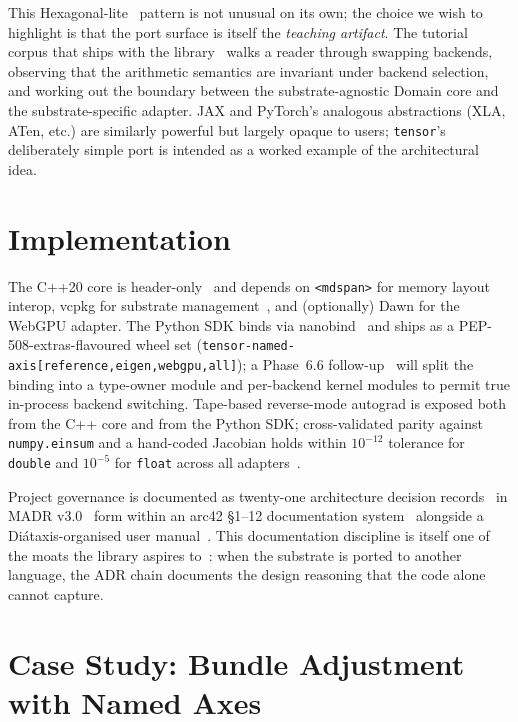 \documentclass[11pt,a4paper]{article}
\begin{document}
\noindent This Hexagonal-lite~\cite{tensorADR0009} pattern is
not unusual on its own; the choice we wish to highlight is that
the port surface is itself the \emph{teaching artifact}. The
tutorial corpus that ships with the library~\cite{tensorTutorials}
walks a reader through swapping backends, observing that the
arithmetic semantics are invariant under backend selection, and
working out the boundary between the substrate-agnostic Domain
core and the substrate-specific adapter. JAX and PyTorch's
analogous abstractions (XLA, ATen, etc.) are similarly powerful
but largely opaque to users; \texttt{tensor}'s deliberately
simple port is intended as a worked example of the architectural
idea.

\section{Implementation}
\label{sec:implementation}

The C++20 core is header-only~\cite{tensorADR0008} and depends
on \texttt{<mdspan>} for memory layout interop, vcpkg for
substrate management~\cite{tensorADR0003}, and (optionally) Dawn
for the WebGPU adapter. The Python SDK
binds via nanobind~\cite{tensorADR0018} and ships as a
PEP-508-extras-flavoured wheel set
(\texttt{tensor-named-axis[reference,eigen,webgpu,all]}); a
Phase~6.6 follow-up~\cite{tensorADR0020} will split the binding
into a type-owner module and per-backend kernel modules to
permit true in-process backend switching. Tape-based
reverse-mode autograd is exposed both from the C++ core and from
the Python SDK; cross-validated parity against
\texttt{numpy.einsum} and a hand-coded Jacobian
holds within $10^{-12}$ tolerance for
\texttt{double} and $10^{-5}$ for \texttt{float} across all
adapters~\cite{tensorADR0017}.

Project governance is documented as twenty-one architecture
decision records~\cite{tensorADRs} in MADR
v3.0~\cite{MADRv3} form within an arc42 §1--12
documentation system~\cite{arc42} alongside a Diátaxis-organised
user manual~\cite{Diataxis}. This documentation discipline is
itself one of the moats the library aspires
to~\cite{tensorADR0015,tensorADR0021}: when the substrate is
ported to another language, the ADR chain documents the design
reasoning that the code alone cannot capture.

\section{Case Study: Bundle Adjustment with Named Axes}
\label{sec:case-study}
\end{document}
